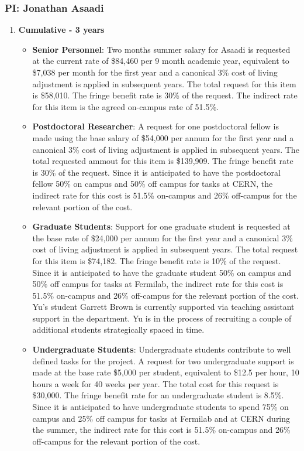 \newpage

\subsubsection{\bf PI: Jonathan Asaadi}

\begin{enumerate}

\item{\bf Cumulative - 3 years}

\begin{itemize}[noitemsep,nolistsep]
\item{{\bf Senior Personnel}: Two months summer salary for Asaadi is requested at the current rate of \$84,460 per 9 month academic year, equivalent to \$7,038 per month for the first year and a canonical 3\% cost of living adjustment is applied in subsequent years.  The total request for this item is \$58,010. The fringe benefit rate is 30\% of the request.  The indirect rate for this item is the agreed on-campus rate of 51.5\%.}

\item {{\bf Postdoctoral Researcher}: A request for one postdoctoral fellow is made using the base salary of \$54,000 per annum for the first year and a canonical 3\% cost of living adjustment is applied in subsequent years.  The total requested ammout for this item is \$139,909. The fringe benefit rate is 30\% of the request.  Since it is anticipated to have the postdoctoral fellow 50\% on campus and 50\% off campus for tasks at CERN, the indirect rate for this cost is 51.5\% on-campus and 26\% off-campus for the relevant portion of the cost.} 

\item{{\bf Graduate Students}: Support for one graduate student is requested at the base rate of \$24,000 per annum for the first year and a canonical 3\% cost of living adjustment is applied in subsequent years. The total request for this item is \$74,182.  The fringe benefit rate is 10\% of the request.  Since it is anticipated to have the graduate student 50\% on campus and 50\% off campus for tasks at Fermilab, the indirect rate for this cost is 51.5\% on-campus and 26\% off-campus for the relevant portion of the cost.   Yu’s student Garrett Brown is currently supported via teaching assistant support in the department.   Yu is in the process of recruiting a couple of additional students strategically spaced in time.}

\item {{\bf Undergraduate Students}: Undergraduate students contribute to well defined tasks for the project.  A request for two undergraduate support is made at the base rate \$5,000 per student, equivalent to \$12.5 per hour, 10 hours a week for 40 weeks per year.  The total cost for this request is \$30,000.  The fringe benefit rate for an undergraduate student is 8.5\%.  Since it is anticipated to have undergraduate students to spend 75\% on campus and 25\% off campus for tasks at Fermilab and at CERN during the summer, the indirect rate for this cost is 51.5\% on-campus and 26\% off-campus for the relevant portion of the cost.}


\end{itemize}
\end{enumerate}
